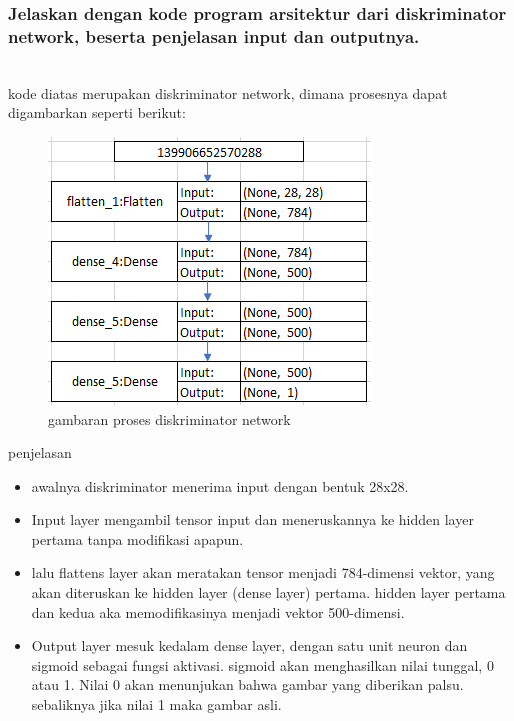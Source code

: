 \subsubsection{Jelaskan dengan kode program arsitektur dari diskriminator network, beserta penjelasan input dan outputnya.}
\hfill\\

kode diatas merupakan diskriminator network, dimana prosesnya dapat digambarkan seperti berikut:
\begin{figure}[H]
	\centering
	\includegraphics[scale=0.5]{figures/1174083/figures8/4a.png}
	\caption{gambaran proses diskriminator network}
\end{figure}
penjelasan
\begin{itemize}
	\item awalnya diskriminator menerima input dengan bentuk 28x28.
	\item Input layer mengambil tensor input dan meneruskannya ke hidden layer pertama tanpa modifikasi apapun.
	\item lalu flattens layer akan meratakan tensor menjadi 784-dimensi vektor, yang akan diteruskan ke hidden layer (dense layer) pertama. hidden layer pertama dan kedua aka memodifikasinya menjadi vektor 500-dimensi.
	\item Output layer mesuk kedalam dense layer, dengan satu unit neuron dan sigmoid sebagai fungsi aktivasi.  sigmoid akan menghasilkan nilai tunggal, 0 atau 1. Nilai 0 akan menunjukan bahwa gambar yang diberikan palsu. sebaliknya jika nilai 1 maka gambar asli.
\end{itemize}

